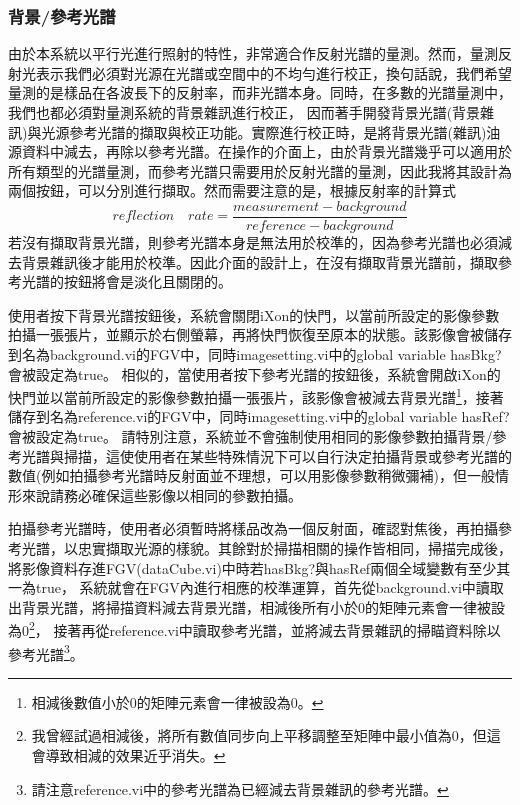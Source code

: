 \documentclass[12pt]{article}
\begin{document}
    \subsubsection{背景/參考光譜}
    由於本系統以平行光進行照射的特性，非常適合作反射光譜的量測。然而，量測反射光表示我們必須對光源在光譜或空間中的不均勻進行校正，換句話說，我們希望量測的是樣品在各波長下的反射率，而非光譜本身。同時，在多數的光譜量測中，我們也都必須對量測系統的背景雜訊進行校正，
    因而著手開發背景光譜(背景雜訊)與光源參考光譜的擷取與校正功能。實際進行校正時，是將背景光譜(雜訊)油源資料中減去，再除以參考光譜。在操作的介面上，由於背景光譜幾乎可以適用於所有類型的光譜量測，而參考光譜只需要用於反射光譜的量測，因此我將其設計為兩個按鈕，可以分別進行擷取。然而需要注意的是，根據反射率的計算式
    \begin{equation}\label{equation: reflection}
        reflection \quad rate=\frac{measurement-background}{reference-background}
    \end{equation}
    若沒有擷取背景光譜，則參考光譜本身是無法用於校準的，因為參考光譜也必須減去背景雜訊後才能用於校準。因此介面的設計上，在沒有擷取背景光譜前，擷取參考光譜的按鈕將會是淡化且關閉的。

    使用者按下背景光譜按鈕後，系統會關閉iXon的快門，以當前所設定的影像參數拍攝一張張片，並顯示於右側螢幕，再將快門恢復至原本的狀態。該影像會被儲存到名為background.vi的FGV中，同時imagesetting.vi中的global variable hasBkg?會被設定為true。
    相似的，當使用者按下參考光譜的按鈕後，系統會開啟iXon的快門並以當前所設定的影像參數拍攝一張張片，該影像會被減去背景光譜\footnote{相減後數值小於0的矩陣元素會一律被設為0。}，接著儲存到名為reference.vi的FGV中，同時imagesetting.vi中的global variable hasRef?會被設定為true。
    請特別注意，系統並不會強制使用相同的影像參數拍攝背景/參考光譜與掃描，這使使用者在某些特殊情況下可以自行決定拍攝背景或參考光譜的數值(例如拍攝參考光譜時反射面並不理想，可以用影像參數稍微彌補)，但一般情形來說請務必確保這些影像以相同的參數拍攝。

    拍攝參考光譜時，使用者必須暫時將樣品改為一個反射面，確認對焦後，再拍攝參考光譜，以忠實擷取光源的樣貌。其餘對於掃描相關的操作皆相同，掃描完成後，將影像資料存進FGV(dataCube.vi)中時若hasBkg?與hasRef兩個全域變數有至少其一為true，
    系統就會在FGV內進行相應的校準運算，首先從background.vi中讀取出背景光譜，將掃描資料減去背景光譜，相減後所有小於0的矩陣元素會一律被設為0\footnote{我曾經試過相減後，將所有數值同步向上平移調整至矩陣中最小值為0，但這會導致相減的效果近乎消失。}，
    接著再從reference.vi中讀取參考光譜，並將減去背景雜訊的掃瞄資料除以參考光譜\footnote{請注意reference.vi中的參考光譜為已經減去背景雜訊的參考光譜。}。
\end{document}
